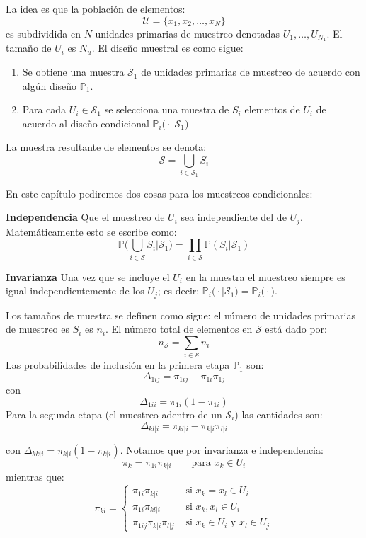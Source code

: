 \documentclass[
]{book}
\providecommand{\tightlist}{%
  \setlength{\itemsep}{0pt}\setlength{\parskip}{0pt}}
\begin{document}
La idea es que la población de elementos:
\[
\mathcal{U} = \{ x_1, x_2, \dots, x_N\}
\]
es subdividida en \(N\) unidades primarias de muestreo denotadas \(U_1, \dots, U_{N_1}\). El tamaño de \(U_i\) es \(N_u\). El diseño muestral es como sigue:

\begin{enumerate}
\def\labelenumi{\alph{enumi}.}
\tightlist
\item
  Se obtiene una muestra \(\mathcal{S}_1\) de unidades primarias de muestreo de acuerdo con algún diseño \(\mathbb{P}_1\).
\item
  Para cada \(U_i \in \mathcal{S}_1\) se selecciona una muestra de \(S_i\) elementos de \(U_i\) de acuerdo al diseño condicional \(\mathbb{P}_i\big(\cdot | \mathcal{S}_1\big)\)
\end{enumerate}

La muestra resultante de elementos se denota:
\[
\mathcal{S} = \bigcup_{i \in \mathcal{S}_1} S_i
\]

En este capítulo pediremos dos cosas para los muestreos condicionales:

\textbf{Independencia} Que el muestreo de \(U_i\) sea independiente del de \(U_j\). Matemáticamente esto se escribe como:
\[
\mathbb{P}\Bigg( \bigcup_{i \in \mathcal{S}} S_i | \mathcal{S}_1 \Bigg)  = \prod\limits_{i \in \mathcal{S}} \mathbb{P}(S_i | \mathcal{S}_1 )
\]

\textbf{Invarianza} Una vez que se incluye el \(U_i\) en la muestra el muestreo siempre es igual independientemente de los \(U_j\); es decir: \(\mathbb{P}_i\big(\cdot | \mathcal{S}_1\big) = \mathbb{P}_i\big(\cdot \big)\).

Los tamaños de muestra se definen como sigue: el número de unidades primarias de muestreo es \(S_i\) es \(n_i\). El número total de elementos en \(\mathcal{S}\) está dado por:
\[
n_{\mathcal{S}} = \sum_{i \in \mathcal{S}} n_{i}
\]
Las probabilidades de inclusión en la primera etapa \(\mathbb{P}_1\) son:
\[
\Delta_{1ij} = \pi_{1ij} - \pi_{1i} \pi_{1j}
\]
con
\[
\Delta_{1ii} = \pi_{1i}(1 - \pi_{1i})
\]
Para la segunda etapa (el muestreo adentro de un \(\mathcal{S}_i\)) las cantidades son:
\[
\Delta_{kl|i} = \pi_{kl|i} - \pi_{k|i} \pi_{l|i}
\]

con \(\Delta_{kk|i} = \pi_{k|i}(1 - \pi_{k|i})\). Notamos que por invarianza e independencia:
\[
\pi_k = \pi_{1i} \pi_{k | i} \qquad \textrm{para } x_k\in U_i
\]
mientras que:
\[
\pi_{kl} = \begin{cases}
\pi_{1i} \pi_{k|i} & \text{ si } x_k = x_l \in U_i\\
\pi_{1i} \pi_{kl|i}  & \text{ si } x_k, x_l \in U_i\\
\pi_{1ij} \pi_{k|i}\pi_{l|j} & \text{ si } x_k \in U_i \text{ y } x_l \in U_j
\end{cases}
\]
\end{document}
